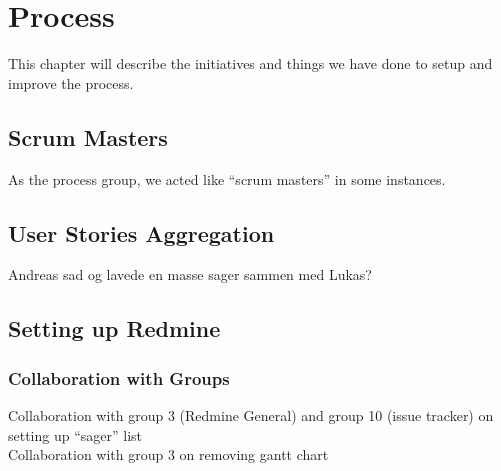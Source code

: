 \chapter{Process}%
This chapter will describe the initiatives and things we have done to setup and improve the process.

\section{Scrum Masters}
As the process group, we acted like ``scrum masters'' in some instances.

\section{User Stories Aggregation}
Andreas sad og lavede en masse sager sammen med Lukas?

\section{Setting up Redmine}
\subsection{Collaboration with Groups}
Collaboration with group 3 (Redmine General) and group 10 (issue tracker) on setting up ``sager'' list\\
Collaboration with group 3 on removing gantt chart